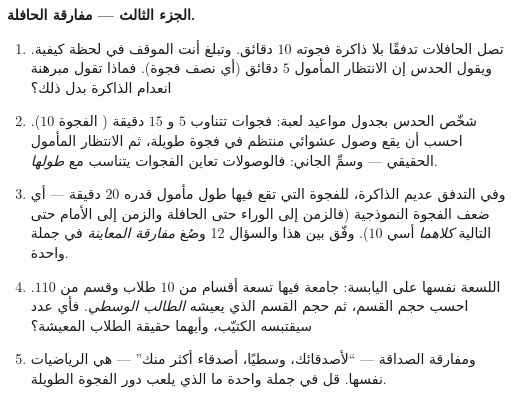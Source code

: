 \begin{problem}
\medskip
\noindent\textbf{الجزء الثالث --- مفارقة الحافلة.}
\begin{enumerate}[resume]
  \item تصل الحافلات تدفقًا بلا ذاكرة  فجوته $10$
        دقائق. وتبلغ أنت الموقف في لحظة كيفية.
        ويقول الحدس إن الانتظار المأمول $5$ دقائق
        (أي نصف فجوة). فماذا تقول مبرهنة انعدام الذاكرة
        بدل ذلك؟
  \item شخّص الحدس بجدول مواعيد لعبة: فجوات
        تتناوب $5$ و $15$ دقيقة ( الفجوة $10$).
        احسب  أن يقع وصول عشوائي منتظم
        في فجوة طويلة، ثم الانتظار المأمول الحقيقي ---
        وسمِّ الجاني: فالوصولات تعاين الفجوات 
        يتناسب مع \emph{طولها}.
  \item وفي التدفق عديم الذاكرة، للفجوة التي تقع فيها طول
        مأمول قدره $20$ دقيقة --- أي ضعف الفجوة النموذجية
        (فالزمن إلى الوراء حتى الحافلة  والزمن إلى الأمام حتى
        التالية \emph{كلاهما} أسي  $10$).
        وفّق بين هذا والسؤال 12 وصُغ
        \emph{مفارقة المعاينة} في جملة واحدة.
  \item اللسعة نفسها على اليابسة: جامعة فيها تسعة أقسام من
        $10$ طلاب وقسم من $110$. احسب 
        حجم القسم، ثم حجم القسم الذي يعيشه \emph{الطالب
        الوسطي}. فأي عدد سيقتبسه الكتيّب،
        وأيهما حقيقة الطلاب المعيشة؟
  \item ومفارقة الصداقة --- ``لأصدقائك، وسطيًا، أصدقاء أكثر
        منك'' --- هي الرياضيات نفسها. قل في جملة واحدة ما الذي يلعب دور
        الفجوة الطويلة.
\end{enumerate}


\end{problem}
